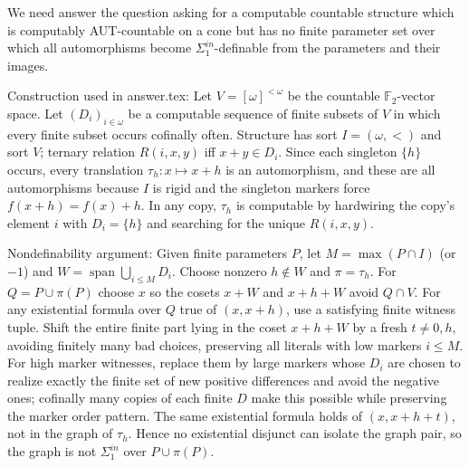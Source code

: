 \documentclass{article}
\begin{document}
We need answer the question asking for a computable countable structure
which is computably AUT-countable on a cone but has no finite parameter
set over which all automorphisms become $\Sigma^{in}_1$-definable from
the parameters and their images.

Construction used in answer.tex:
Let $V=[\omega]^{<\omega}$ be the countable $\mathbb F_2$-vector space.
Let $(D_i)_{i\in\omega}$ be a computable sequence of finite subsets of
$V$ in which every finite subset occurs cofinally often.  Structure has
sort $I=(\omega,<)$ and sort $V$; ternary relation
$R(i,x,y)$ iff $x+y\in D_i$.  Since each singleton $\{h\}$ occurs, every
translation $\tau_h:x\mapsto x+h$ is an automorphism, and these are all
automorphisms because $I$ is rigid and the singleton markers force
$f(x+h)=f(x)+h$.  In any copy, $\tau_h$ is computable by hardwiring the
copy's element $i$ with $D_i=\{h\}$ and searching for the unique
$R(i,x,y)$.

Nondefinability argument:
Given finite parameters $P$, let $M=\max(P\cap I)$ (or $-1$) and
$W=\operatorname{span}\bigcup_{i\le M}D_i$.  Choose nonzero
$h\notin W$ and $\pi=\tau_h$.  For $Q=P\cup\pi(P)$ choose $x$ so the
cosets $x+W$ and $x+h+W$ avoid $Q\cap V$.  For any existential formula
over $Q$ true of $(x,x+h)$, use a satisfying finite witness tuple.
Shift the entire finite part lying in the coset $x+h+W$ by a fresh
$t\ne0,h$, avoiding finitely many bad choices, preserving all literals
with low markers $i\le M$.  For high marker witnesses, replace them by
large markers whose $D_i$ are chosen to realize exactly the finite set of
new positive differences and avoid the negative ones; cofinally many
copies of each finite $D$ make this possible while preserving the marker
order pattern.  The same existential formula holds of $(x,x+h+t)$, not
in the graph of $\tau_h$.  Hence no existential disjunct can isolate the
graph pair, so the graph is not $\Sigma^{in}_1$ over $P\cup\pi(P)$.
\end{document}
